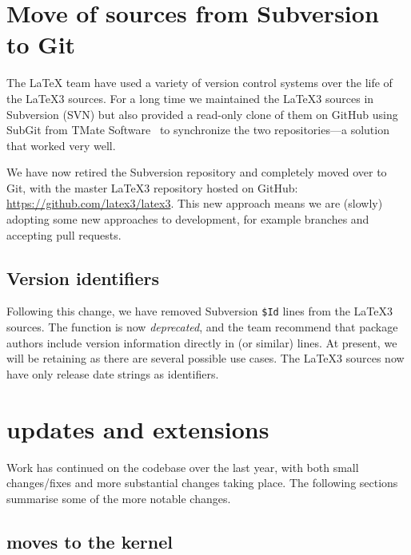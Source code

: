 \documentclass{ltnews}
\begin{document}
\maketitle

\tableofcontents


\section{Move of sources from Subversion to Git}

The \LaTeX{} team have used a variety of version control systems over the life
of the \LaTeX3 sources. For a long time we maintained the \LaTeX3 sources in
Subversion (SVN) but also provided a read-only clone of them on GitHub using
SubGit from TMate Software~\cite{SubGit} to synchronize the two
repositories---a solution that worked very well.

We have now retired the Subversion repository and completely moved over to Git,
with the master \LaTeX3 repository hosted on GitHub:
\url{https://github.com/latex3/latex3}. This new approach means we are (slowly)
adopting some new approaches to development, for example branches and accepting
pull requests.

\subsection{Version identifiers}

Following this change, we have removed Subversion \verb=$Id= lines from the
\LaTeX3 sources. The function  is now \emph{deprecated}, and the
team recommend that package authors include version information directly in
 (or similar) lines. At present, we will be retaining
 as there are several possible use cases. The \LaTeX3 sources now
have only release date strings as identifiers.

\section{ updates and extensions}

Work has continued on the codebase over the last year, with both small
changes/fixes and more substantial changes taking place. The following sections
summarise some of the more notable changes.

\subsection{ moves to the kernel}
\end{document}
